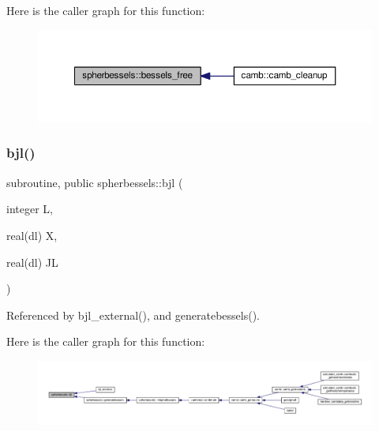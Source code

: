 Here is the caller graph for this function\+:
\nopagebreak
\begin{figure}[H]
\begin{center}
\leavevmode
\includegraphics[width=350pt]{namespacespherbessels_a0abb3ebb234b8547151b14c0cdb439be_icgraph}
\end{center}
\end{figure}
\mbox{\label{namespacespherbessels_a1619c25c91b245252b30a3da4d640050}} 
\subsubsection{\texorpdfstring{bjl()}{bjl()}}
{\footnotesize\ttfamily subroutine, public spherbessels\+::bjl (\begin{DoxyParamCaption}\item[{integer}]{L,  }\item[{real(dl)}]{X,  }\item[{real(dl)}]{JL }\end{DoxyParamCaption})}



Referenced by bjl\+\_\+external(), and generatebessels().

Here is the caller graph for this function\+:
\nopagebreak
\begin{figure}[H]
\begin{center}
\leavevmode
\includegraphics[width=350pt]{namespacespherbessels_a1619c25c91b245252b30a3da4d640050_icgraph}
\end{center}
\end{figure}
\mbox{\label{namespacespherbessels_a94dad04f4df289878f0e038437916427}} 
